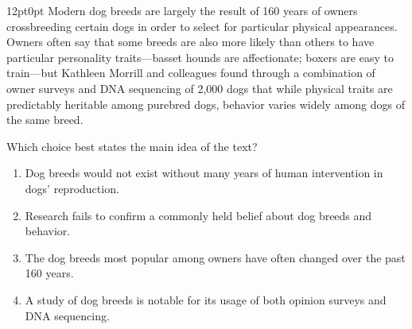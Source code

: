 \documentclass[11pt, twocolumn]{article}
\newcounter{questionnum}
\begin{document}
\vspace{6pt}\noindent
\begin{minipage}{\columnwidth}\raggedright
\noindent{}\par\vspace{8pt}
\begin{adjustwidth}{12pt}{0pt}
Modern dog breeds are largely the result of 160 years of owners crossbreeding certain dogs in order to select for particular physical appearances. Owners often say that some breeds are also more likely than others to have particular personality traits---basset hounds are affectionate; boxers are easy to train---but Kathleen Morrill and colleagues found through a combination of owner surveys and DNA sequencing of 2,000 dogs that while physical traits are predictably heritable among purebred dogs, behavior varies widely among dogs of the same breed.
\vspace{6pt}

Which choice best states the main idea of the text?
\begin{enumerate}[label=\Alph*),leftmargin=18pt,topsep=3pt,itemsep=2pt]
  \item Dog breeds would not exist without many years of human intervention in dogs' reproduction.
  \item Research fails to confirm a commonly held belief about dog breeds and behavior.
  \item The dog breeds most popular among owners have often changed over the past 160 years.
  \item A study of dog breeds is notable for its usage of both opinion surveys and DNA sequencing.
\end{enumerate}
\end{adjustwidth}
\end{minipage}\par
\end{document}

